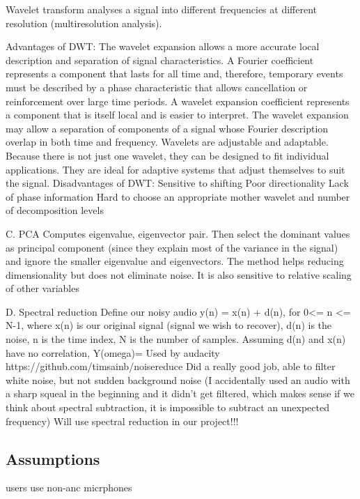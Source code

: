 Wavelet transform analyses a signal into different frequencies at different resolution (multiresolution analysis). 

Advantages of DWT:
	The wavelet expansion allows a more accurate local description and separation of signal characteristics. A Fourier coefficient represents a component that lasts for all time and, therefore, temporary events must be described by a phase characteristic that allows cancellation or reinforcement over large time periods. A wavelet expansion coefficient represents a component that is itself local and is easier to interpret. The wavelet expansion may allow a separation of components of a signal whose Fourier description overlap in both time and frequency.
	Wavelets are adjustable and adaptable. Because there is not just one wavelet, they can be designed to fit individual applications. They are ideal for adaptive systems that adjust themselves to suit the signal.
Disadvantages of DWT:
	Sensitive to shifting
	Poor directionality
	Lack of phase information
	Hard to choose an appropriate mother wavelet and number of decomposition levels

C. PCA
Computes eigenvalue, eigenvector pair. Then select the dominant values as principal component (since they explain most of the variance in the signal) and ignore the smaller eigenvalue and eigenvectors.
The method helps reducing dimensionality but does not eliminate noise. It is also sensitive to relative scaling of other variables 


D. Spectral reduction
Define our noisy audio y(n) = x(n) + d(n), for 0<= n <= N-1, where x(n) is our original signal (signal we wish to recover), d(n) is the noise, n is the time index, N is the number of samples. 
Assuming d(n) and x(n) have no correlation, Y(omega)= 
Used by audacity
https://github.com/timsainb/noisereduce
	Did a really good job, able to filter white noise, but not sudden background noise (I accidentally used an audio with a sharp squeal in the beginning and it didn’t get filtered, which makes sense if we think about spectral subtraction, it is impossible to subtract an unexpected frequency)
	Will use spectral reduction in our project!!! 


\subsection{Assumptions}
users use non-anc micrphones

